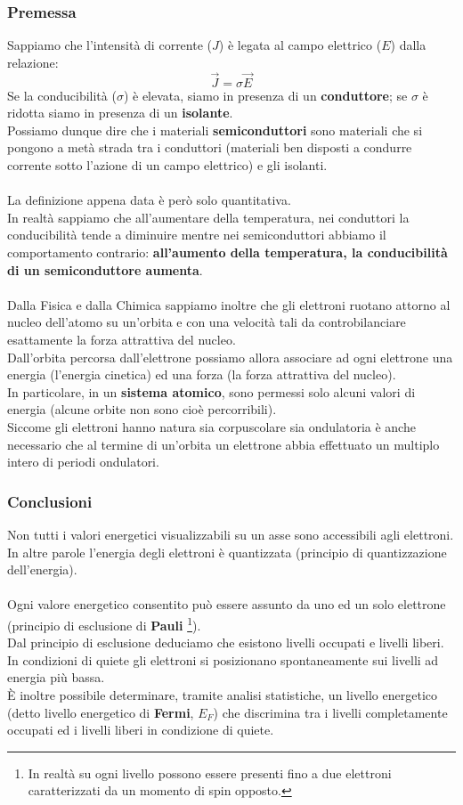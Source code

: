 \documentclass{article}
\numberwithin{equation}{subsection}
\begin{document}
	\subsubsection{Premessa}
	Sappiamo che l’intensità di corrente ($J$) è legata al campo elettrico ($E$) dalla relazione:
	$$\vec{J} = \sigma \vec{E}$$
	Se la conducibilità ($\sigma$) è elevata, siamo in presenza di un \textbf{conduttore}; se $\sigma$ è ridotta siamo in presenza di un \textbf{isolante}.\\
	Possiamo dunque dire che i materiali \textbf{semiconduttori} sono materiali che si pongono a metà strada tra i conduttori (materiali ben disposti a condurre corrente sotto l’azione di un campo elettrico) e gli isolanti.\\\\
	La definizione appena data è però solo quantitativa. \\
	In realtà sappiamo che all’aumentare della temperatura, nei conduttori la conducibilità tende a diminuire mentre nei semiconduttori abbiamo il comportamento contrario: \textbf{all’aumento della temperatura, la conducibilità di un semiconduttore aumenta}.\\\\
	Dalla Fisica e dalla Chimica sappiamo inoltre che gli elettroni ruotano attorno al nucleo dell’atomo su un’orbita e con una velocità tali da controbilanciare esattamente la forza attrattiva del nucleo.\\
	Dall’orbita percorsa dall’elettrone possiamo allora associare ad ogni elettrone una energia (l’energia cinetica) ed una forza (la forza attrattiva del nucleo).\\
	In particolare, in un \textbf{sistema atomico}, sono permessi solo alcuni valori di energia (alcune orbite non sono cioè percorribili).\\
	Siccome gli elettroni hanno natura sia corpuscolare sia ondulatoria è anche necessario che al termine di un’orbita un elettrone abbia effettuato un multiplo intero di periodi ondulatori.
	\subsubsection{Conclusioni}
	Non tutti i valori energetici visualizzabili su un asse sono accessibili agli elettroni.\\
	In altre parole l’energia degli elettroni è quantizzata (principio di quantizzazione dell’energia).\\\\
	Ogni valore energetico consentito può essere assunto da uno ed un solo elettrone (principio di esclusione di \textbf{Pauli} \footnote{In realtà su ogni livello possono essere presenti fino a due elettroni caratterizzati da un momento di spin opposto.}).\\
	Dal principio di esclusione deduciamo che esistono livelli occupati e livelli liberi.\\
	In condizioni di quiete gli elettroni si posizionano spontaneamente sui livelli ad energia più bassa.\\
	È inoltre possibile determinare, tramite analisi statistiche, un livello energetico (detto livello energetico di \textbf{Fermi}, $E_F$) che discrimina tra i livelli completamente occupati ed i livelli liberi in condizione di quiete.
\end{document}
